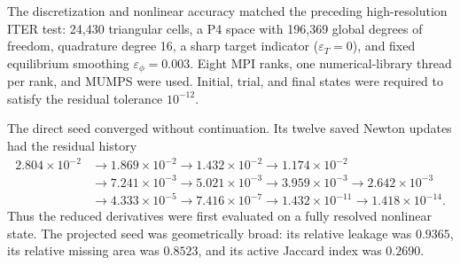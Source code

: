 The discretization and nonlinear accuracy matched the preceding
high-resolution ITER test: 24,430 triangular cells, a P4 space with 196,369
global degrees of freedom, quadrature degree 16, a sharp target indicator
($\varepsilon_T=0$), and fixed equilibrium smoothing
$\varepsilon_\phi=0.003$. Eight MPI ranks, one numerical-library thread per
rank, and MUMPS were used. Initial, trial, and final states were required to
satisfy the residual tolerance $10^{-12}$.

The direct seed converged without continuation. Its twelve saved Newton
updates had the residual history
\[
\begin{aligned}
  2.804\!\times\!10^{-2}&\to1.869\!\times\!10^{-2}
  \to1.432\!\times\!10^{-2}\to1.174\!\times\!10^{-2}\\
  &\to7.241\!\times\!10^{-3}\to5.021\!\times\!10^{-3}
  \to3.959\!\times\!10^{-3}\to2.642\!\times\!10^{-3}\\
  &\to4.333\!\times\!10^{-5}\to7.416\!\times\!10^{-7}
  \to1.432\!\times\!10^{-11}\to1.418\!\times\!10^{-14}.
\end{aligned}
\]
Thus the reduced derivatives were first evaluated on a fully resolved
nonlinear state. The projected seed was geometrically broad: its relative
leakage was $0.9365$, its relative missing area was $0.8523$, and its active
Jaccard index was $0.2690$.

